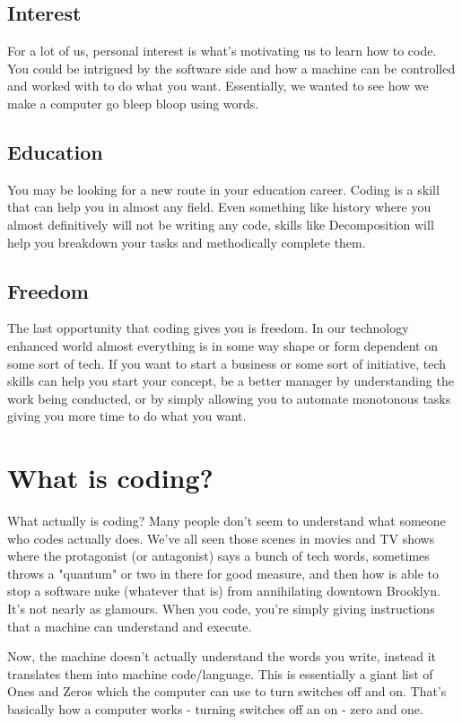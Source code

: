 \documentclass[12pt,a4paper]{book}
\begin{document}
		\section{Interest}
			For a lot of us, personal interest is what's motivating us to learn how to code. You could be intrigued by the software side and how a machine can be controlled and worked with to do what you want. Essentially, we wanted to see how we make a computer go bleep bloop using words.
		\section{Education}
			You may be looking for a new route in your education career. Coding is a skill that can help you in almost any field. Even something like history where you almost definitively will not be writing any code, skills like Decomposition will help you breakdown your tasks and methodically complete them. 
		\section{Freedom}
			The last opportunity that coding gives you is freedom. In our technology enhanced world almost everything is in some way shape or form dependent on some sort of tech. If you want to start a business or some sort of initiative, tech skills can help you start your concept, be a better manager by understanding the work being conducted, or by simply allowing you to automate monotonous tasks giving you more time to do what you want. 

	\chapter{What is coding?}  \label{chap:intro-coding}
		What actually is coding? Many people don't seem to understand what someone who  codes actually does. We've all seen those scenes in movies and TV shows where the protagonist (or antagonist) says a bunch of tech words, sometimes throws a "quantum" or two in there for good measure, and then how is able to stop a software nuke (whatever that is) from annihilating downtown Brooklyn. It's not nearly as glamours. When you code, you're simply giving instructions that a machine can understand and execute.
		
		Now, the machine doesn't actually understand the words you write, instead it translates them into machine code/language. This is essentially a giant list of Ones and Zeros which the computer can use to turn switches off and on. That's basically how a computer works - turning switches off an on - zero and one.
		
\end{document}
